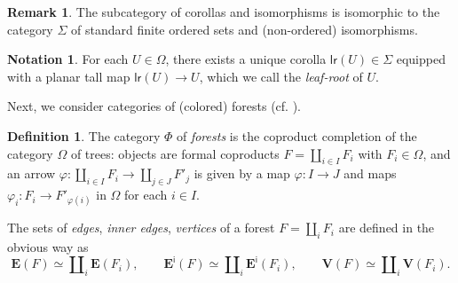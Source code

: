 \documentclass[a4paper,10pt
,draft
]{article}%
\numberwithin{equation}{section}
\numberwithin{figure}{section}
\theoremstyle{definition} %
\newtheorem{definition}[equation]{Definition}%
\newtheorem{remark}[equation]{Remark}%
\newtheorem{notation}[equation]{Notation}%
\newcommand{\1}{\ensuremath{\mathbbm 1}}%
\begin{document}
\begin{remark}
      The subcategory of corollas and isomorphisms is isomorphic to the category $\Sigma$ of standard finite ordered sets and (non-ordered) isomorphisms.
\end{remark}


\begin{notation}
      \label{LR_NOT}
      For each $U \in \Omega$, there exists a unique corolla $\mathsf{lr}(U) \in \Sigma$ equipped with a planar tall map $\mathsf{lr}(U) \to U$,
      which we call the \textit{leaf-root} of $U$.
\end{notation}



Next, we consider categories of (colored) forests (cf. \cite[Defn. 2.56]{BP_HGOP}).

\begin{definition}
      The category $\Phi$ of \textit{forests} is the coproduct completion of the category $\Omega$ of trees:
      objects are formal coproducts 
      $F = \amalg_{i \in I} F_i$ with $F_i \in \Omega$,
      and an arrow 
      $\varphi \colon \amalg_{i \in I} F_i \to
      \amalg_{j \in J} F'_j$ is given by
      a map $\varphi \colon I \to J$ and
      maps $\varphi_i \colon F_i \to F'_{\varphi(i)}$ in $\Omega$ for each $i \in I$.

The sets of \emph{edges}, \emph{inner edges}, \emph{vertices}
of a forest $F = \amalg_i F_i$
are defined in the obvious way as
\[
	\boldsymbol{E}(F)
	\simeq
	\amalg_i \boldsymbol{E}(F_i),
\qquad
	\boldsymbol{E}^{\mathsf{i}}(F)
	\simeq
	\amalg_i \boldsymbol{E}^{\mathsf{i}}(F_i),
\qquad
	\boldsymbol{V}(F)
	\simeq
	\amalg_i \boldsymbol{V}(F_i).
\]
\end{definition}
\end{document}
